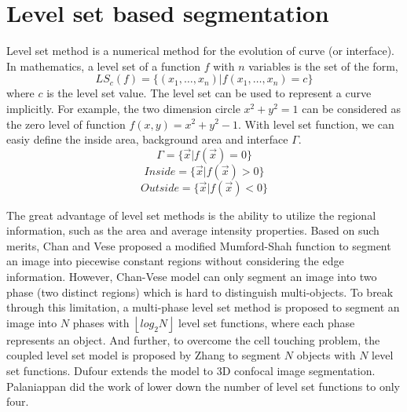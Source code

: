 \section{Level set based segmentation}
Level set method is a numerical method for the evolution of curve (or interface). In mathematics, a level set of a function $f$ with $n$ variables is the set of the form,
\begin{equation}
LS_c(f) = \{(x_1,\ldots,x_n)|f(x_1,\ldots,x_n) = c\}
\end{equation}
where $c$ is the level set value. The level set can be used to represent a curve implicitly. For example, the two dimension circle $x^2 + y^2 = 1$ can be considered as the zero level of function $f(x,y) = x^2 + y^2 - 1$. With level set function, we can easiy define the inside area, background area and interface $\Gamma$.
\begin{equation}
\Gamma = \{\vec{x}|f(\vec{x}) = 0\}
\end{equation}
\begin{equation}
Inside = \{\vec{x}|f(\vec{x}) > 0\}
\end{equation}
\begin{equation}
Outside = \{\vec{x}|f(\vec{x}) < 0\}
\end{equation}

The great advantage of level set methods is the ability to utilize the regional information, such as the area and average intensity properties. Based on such merits, Chan and Vese \cite{chan2001active,chan2000active} proposed a modified Mumford-Shah function to segment an image into piecewise constant regions without considering the edge information. However, Chan-Vese model can only segment an image into two phase (two distinct regions) which is hard to distinguish multi-objects. To break through this limitation, a multi-phase level set method \cite{vese2002multiphase} is proposed to segment an image into $N$ phases with $\left \lfloor log_2N \right \rfloor$ level set functions, where each phase represents an object. And further, to overcome the cell touching problem, the coupled level set model is proposed by Zhang \cite{zhang2004tracking} to segment $N$ objects with $N$ level set functions. Dufour \cite{dufour2005segmenting} extends the model to 3D confocal image segmentation. Palaniappan \cite{nath2006robust} did the work of lower down the number of level set functions to only four.

